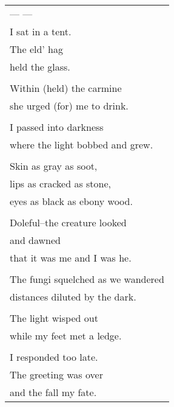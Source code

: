 \documentclass{article}
\begin{document}
\begin{tabular}{l}
\\
--- --- \\
I sat in a tent. \\
The eld' hag \\
held the glass. \\
\\
Within (held) the carmine \\
she urged (for) me to drink. \\
\\
I passed into darkness \\
where the light bobbed and grew. \\
\\
Skin as gray as soot, \\
lips as cracked as stone, \\
eyes as black as ebony wood. \\
\\
Doleful--the creature looked \\
and dawned \\
that it was me and I was he. \\
\\
The fungi squelched as we wandered \\
distances diluted by the dark. \\
\\
The light wisped out \\
while my feet met a ledge. \\
\\
I responded too late. \\
The greeting was over \\
and the fall my fate. \\
\end{tabular} \\
\end{document}
